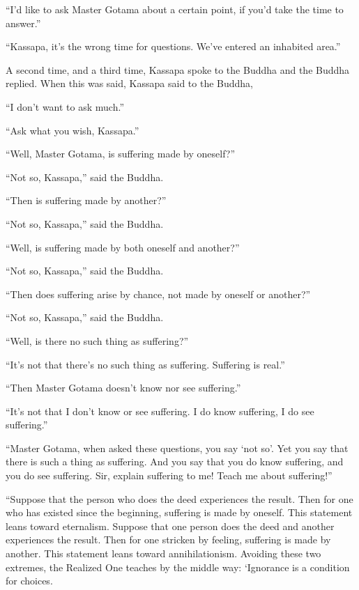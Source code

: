\documentclass[12pt,openany]{book}%
\begin{document}
“I’d like to ask Master Gotama about a certain point, if you’d take the time to answer.” 

“Kassapa, it’s the wrong time for questions. We’ve entered an inhabited area.” 

A second time, and a third time, Kassapa spoke to the Buddha and the Buddha replied. When this was said, Kassapa said to the Buddha, 

“I don’t want to ask much.” 

“Ask what you wish, Kassapa.” 

“Well, Master Gotama, is suffering made by oneself?” 

“Not so, Kassapa,” said the Buddha. 

“Then is suffering made by another?” 

“Not so, Kassapa,” said the Buddha. 

“Well, is suffering made by both oneself and another?” 

“Not so, Kassapa,” said the Buddha. 

“Then does suffering arise by chance, not made by oneself or another?” 

“Not so, Kassapa,” said the Buddha. 

“Well, is there no such thing as suffering?” 

“It’s not that there’s no such thing as suffering. Suffering is real.” 

“Then Master Gotama doesn’t know nor see suffering.” 

“It’s not that I don’t know or see suffering. I do know suffering, I do see suffering.” 

“Master Gotama, when asked these questions, you say ‘not so’. Yet you say that there is such a thing as suffering. And you say that you do know suffering, and you do see suffering. Sir, explain suffering to me! Teach me about suffering!” 

“Suppose that the person who does the deed experiences the result. Then for one who has existed since the beginning, suffering is made by oneself. This statement leans toward eternalism. Suppose that one person does the deed and another experiences the result. Then for one stricken by feeling, suffering is made by another. This statement leans toward annihilationism. Avoiding these two extremes, the Realized One teaches by the middle way: ‘Ignorance is a condition for choices. 
\end{document}
